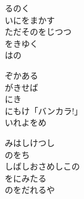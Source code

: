 \documentclass[10pt,b5j]{tarticle} %
\begin{document}
\vspace{1.5em} %
\newcommand{\linespace}{0.5em} %
\newcommand{\blocksize}{0.5\hsize} %
\begin{enumerate} %
    \begin{minipage}[c]{\blocksize}
    
        \vspace{\linespace}
        \item
        るのく\\
        いにをまかす\\
        ただそのをじつつ\\
        をきゆく\\
        はの
        
        \vspace{\linespace}
        \item
        ぞかある\\
        がきせば\\
        にき\\
        にもけ「バンカラ!」\\
        いれよをめ
        
        \vspace{\linespace}
        \item
        みはしけつし\\
        のをち\\
        しばしおさめしこの\\
        をにみたる\\
        のをだれるや
    
    \end{minipage}
\end{enumerate} %
\end{document}
